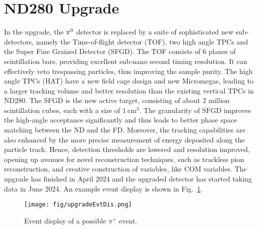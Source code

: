 \section{\label{sec:ndup} ND280 Upgrade}
   In the upgrade, the $\pi^0$ detector is replaced by a suite of sophisticated new sub-detectors, namely the Time-of-flight detector (TOF), two high angle TPCs and the Super Fine Grained Detector (SFGD). 
   The TOF consists of 6 planes of scintillation bars, providing excellent sub-nano second timing resolution. 
   It can effectively veto trespassing particles, thus improving the sample purity.
   The high angle TPCs (HAT) have a new field cage design and new Micromegas, leading to a larger tracking volume and better resolution than the existing vertical TPCs in ND280. 
   The SFGD is the new active target, consisting of about 2 million scintillation cubes, each with a size of $1~\textrm{cm}^3$. 
   The granularity of SFGD improves the high-angle acceptance significantly and thus leads to better phase space matching between the ND and the FD. 
   Moreover, the tracking capabilities are also enhanced by the more precise measurement of energy deposited along the particle track. 
   Hence, detection thresholds are lowered and resolution improved, opening up avenues for novel reconstruction techniques, such as trackless pion reconstruction, and creative construction of variables, like COM variables. 
   The upgrade has finished in April 2024 and the upgraded detector has started taking data in June 2024. An example event display is shown in Fig.~\ref{fig:ndup-evedis}. 

    \begin{figure}[!htb]
        \centering
        \texttt{[image: fig/upgradeEvtDis.png]}
        \caption{Event display of a possible $\pi^+$ event.}
        \label{fig:ndup-evedis}
    \end{figure}